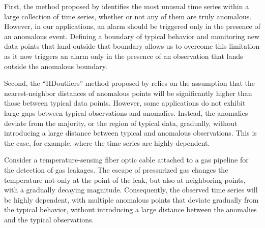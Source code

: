 \documentclass[12pt]{article}
\begin{document}
First, the method proposed by \citet{hyndman2015large} identifies the
most unusual time series within a large collection of time series,
whether or not any of them are truly anomalous. However, in our
applications, an alarm should be triggered only in the presence of an
anomalous event. Defining a boundary of typical behavior and monitoring
new data points that land outside that boundary allows us to overcome
this limitation as it now triggers an alarm only in the presence of an
observation that lands outside the anomalous boundary.

Second, the ``HDoutliers'' method proposed by
\citet{wilkinsonvisualizing} relies on the assumption that the
nearest-neighbor distances of anomalous points will be significantly
higher than those between typical data points. However, some
applications do not exhibit large gaps between typical observations and
anomalies. Instead, the anomalies deviate from the majority, or the
region of typical data, gradually, without introducing a large distance
between typical and anomalous observations. This is the case, for
example, where the time series are highly dependent.

Consider a temperature-sensing fiber optic cable attached to a gas
pipeline for the detection of gas leakages. The escape of pressurized
gas changes the temperature not only at the point of the leak, but also
at neighboring points, with a gradually decaying magnitude.
Consequently, the observed time series will be highly dependent, with
multiple anomalous points that deviate gradually from the typical
behavior, without introducing a large distance between the anomalies and
the typical observations.
\end{document}
